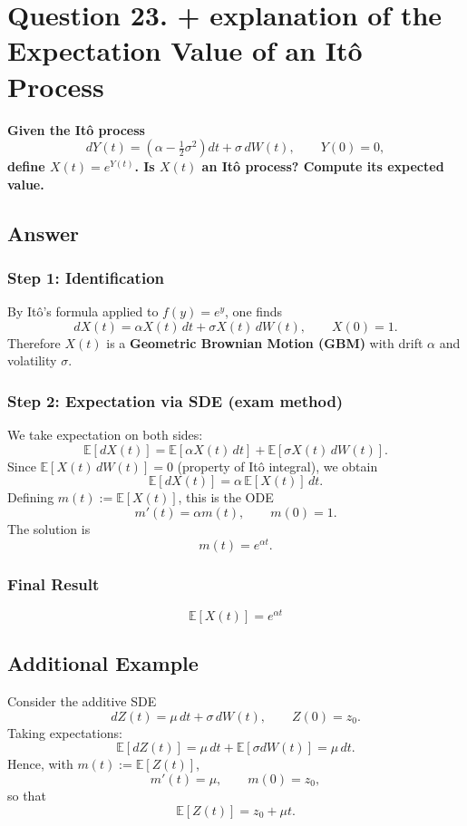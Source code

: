 \documentclass[12pt,a4paper]{book}
\theoremstyle{remark}
\begin{document}
\newpage
\section{Question 23. + explanation of the Expectation Value of an It\^o Process}

\textbf{Given the It\^o process}
\[
dY(t) = \left(\alpha - \tfrac{1}{2}\sigma^2\right)dt + \sigma\,dW(t), 
\qquad Y(0)=0,
\]
\textbf{define $X(t)=e^{Y(t)}$. Is $X(t)$ an It\^o process? Compute its expected value.}

\subsection*{Answer}

\subsubsection*{Step 1: Identification}
By It\^o’s formula applied to $f(y)=e^y$, one finds
\[
dX(t) = \alpha X(t)\,dt + \sigma X(t)\,dW(t), \qquad X(0)=1.
\]
Therefore $X(t)$ is a \textbf{Geometric Brownian Motion (GBM)} with drift $\alpha$ and volatility $\sigma$.

\subsubsection*{Step 2: Expectation via SDE (exam method)}
We take expectation on both sides:
\[
\mathbb{E}[dX(t)] 
= \mathbb{E}[\alpha X(t)\,dt] + \mathbb{E}[\sigma X(t)\,dW(t)].
\]
Since $\mathbb{E}[X(t)\,dW(t)] = 0$ (property of It\^o integral), we obtain
\[
\mathbb{E}[dX(t)] = \alpha \,\mathbb{E}[X(t)]\,dt.
\]
Defining $m(t) := \mathbb{E}[X(t)]$, this is the ODE
\[
m'(t) = \alpha m(t), \qquad m(0) = 1.
\]
The solution is
\[
m(t) = e^{\alpha t}.
\]

\subsubsection*{Final Result}
\[
\boxed{\;\mathbb{E}[X(t)] = e^{\alpha t}\;}
\]

\subsection*{Additional Example}
Consider the additive SDE
\[
dZ(t) = \mu\,dt + \sigma\,dW(t), \qquad Z(0)=z_0.
\]
Taking expectations:
\[
\mathbb{E}[dZ(t)] = \mu\,dt + \mathbb{E}[\sigma dW(t)] = \mu\,dt.
\]
Hence, with $m(t):=\mathbb{E}[Z(t)]$,
\[
m'(t) = \mu, \qquad m(0)=z_0,
\]
so that
\[
\boxed{\;\mathbb{E}[Z(t)] = z_0 + \mu t.\;}
\]
\end{document}
